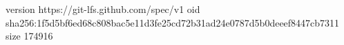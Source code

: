 version https://git-lfs.github.com/spec/v1
oid sha256:1f5d5bf6ed68c808bac5e11d3fe25cd72b31ad24e0787d5b0deeef8447cb7311
size 174916
